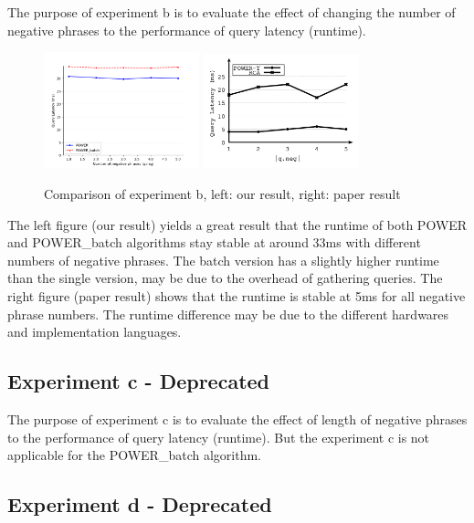 \documentclass[]{IEEEphot}
\begin{document}
The purpose of experiment b is to evaluate the effect of changing the number of negative phrases to the performance of query latency (runtime).

\begin{figure}[h]
    \centering
    \includegraphics[width=0.4\textwidth]{../exp_plots/b_4m_50queries_20250314-212603.png}
    \includegraphics[width=0.4\textwidth]{./pics/paper-exp-b.png}
    \caption{Comparison of experiment b, left: our result, right: paper result}
\end{figure}

The left figure (our result) yields a great result that the runtime of both POWER and POWER\_batch algorithms stay stable at around 33ms with different numbers of negative phrases. The batch version has a slightly higher runtime than the single version, may be due to the overhead of gathering queries. The right figure (paper result) shows that the runtime is stable at 5ms for all negative phrase numbers. The runtime difference may be due to the different hardwares and implementation languages.

\subsection{Experiment c - Deprecated}

The purpose of experiment c is to evaluate the effect of length of negative phrases to the performance of query latency (runtime). But the experiment c is not applicable for the POWER\_batch algorithm.

\subsection{Experiment d - Deprecated}
\end{document}
